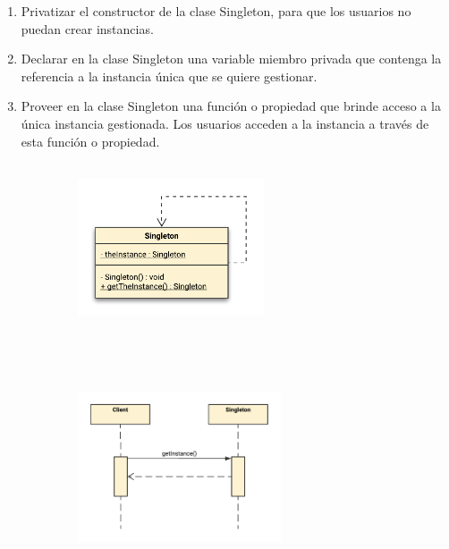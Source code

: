 \documentclass[12pt,a4paper, twoside]{report}
\begin{document}
	\begin{enumerate}
		\item Privatizar el constructor de la clase Singleton, para que los usuarios no puedan crear instancias.
		\item Declarar en la clase Singleton una variable miembro privada que contenga la referencia a la instancia única que se quiere gestionar.
		\item Proveer en la clase Singleton una función o propiedad que brinde acceso a la única instancia gestionada. Los usuarios acceden a la instancia a través de esta función o propiedad.
	\end{enumerate}
	
	\begin{figure}[h]		
		\caption{Diagrama de clases y de secuencia del \gls{patrondiseño} creacional Singleton.}
 		\begin{subfigure}{0.5\textwidth}
 			\hbox{
 				\hspace{1cm}
 				\includegraphics[width=5.5cm, height=5cm]{Images/design/singleton_uml.png} 
 			}
		\end{subfigure}
		\begin{subfigure}{0.5\textwidth}
			\hbox{
 				\hspace{2cm}
				\includegraphics[width=6cm, height=7cm]{Images/design/singleton_secuencia}
			}
		\end{subfigure}
		\label{fig:design_singleton}
	\end{figure}
 	
\end{document}
